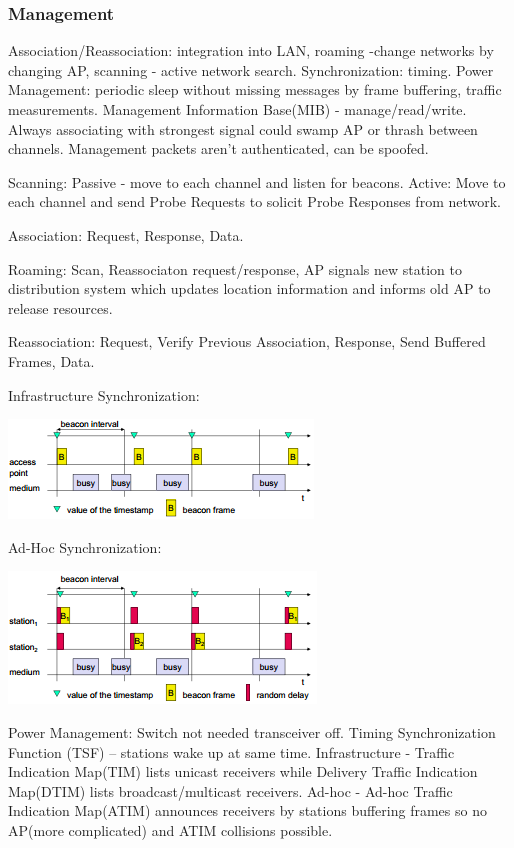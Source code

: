 \documentclass[9pt]{extarticle}
\begin{document}
\begin{multicols}{2}
\subsubsection{Management}

Association/Reassociation: integration into LAN, roaming -change networks by changing AP, scanning - active network search. Synchronization: timing. Power Management: periodic sleep without missing messages by frame buffering, traffic measurements. Management Information Base(MIB) - manage/read/write. Always associating with strongest signal could swamp AP or thrash between channels. Management packets aren't authenticated, can be spoofed.

Scanning: Passive - move to each channel and listen for beacons. Active:  Move to each channel and send Probe Requests to solicit Probe Responses from network.

Association: Request, Response, Data.

Roaming: Scan, Reassociaton request/response, AP signals new station to distribution system which updates location information and informs old AP to release resources.

Reassociation: Request, Verify Previous Association, Response, Send Buffered Frames, Data.

Infrastructure Synchronization:

\includegraphics{infrastructuresynchronization.png}

Ad-Hoc Synchronization: 

\includegraphics{adhocsynchronization.png}

Power Management: Switch not needed transceiver off. Timing Synchronization Function (TSF) – stations wake up at same time. Infrastructure - Traffic Indication Map(TIM) lists unicast receivers while Delivery Traffic Indication Map(DTIM) lists broadcast/multicast receivers. Ad-hoc - Ad-hoc Traffic Indication Map(ATIM) announces receivers by stations buffering frames so no AP(more complicated) and ATIM collisions possible.


\end{multicols}
\end{document}

